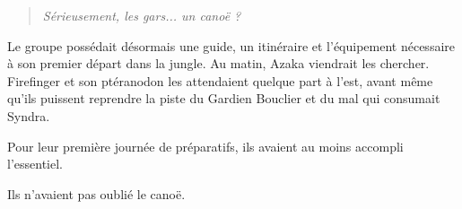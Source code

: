 \begin{quote}\itshape
Sérieusement, les gars... un canoë ?
\end{quote}

Le groupe possédait désormais une guide, un itinéraire et l'équipement nécessaire à son premier départ dans la jungle. Au matin, Azaka viendrait les chercher. Firefinger et son ptéranodon les attendaient quelque part à l'est, avant même qu'ils puissent reprendre la piste du Gardien Bouclier et du mal qui consumait Syndra.

Pour leur première journée de préparatifs, ils avaient au moins accompli l'essentiel.

Ils n'avaient pas oublié le canoë.
